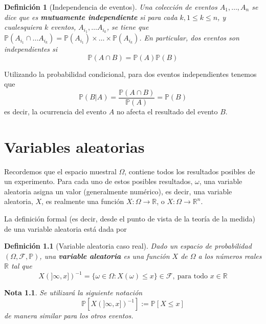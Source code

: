 \documentclass[11pt]{report}
\theoremstyle{break}
\newtheorem{definicion}{Definición}[chapter]
\newtheorem{nota}{Nota}[chapter]
\theoremstyle{break}
\begin{document}
\begin{definicion}[Independencia de eventos]
\label{definicion:independencia de eventos}
Una colección de eventos $A_1, \ldots, A_n$ se dice que es \textbf{mutuamente independiente} si para cada $k, 1 \leq k \leq n$, y cualesquiera $k$ eventos, $A_{i_1}, \ldots A_{i_k}$, se tiene que $\mathbb{P}(A_{i_1} \cap \ldots A_{i_k}) = \mathbb{P}(A_{i_1}) \times \ldots \times \mathbb{P}(A_{i_k})$.
En particular, dos eventos son independientes si
$$
\mathbb{P}(A \cap B) = \mathbb{P}(A)\mathbb{P}(B)
$$ 
\end{definicion}
Utilizando la probabilidad condicional, para dos eventos independientes tenemos que
$$
\mathbb{P}(B|A) = \dfrac{\mathbb{P}(A \cap B)}{\mathbb{P}(A)} = \mathbb{P}(B)
$$
es decir, la ocurrencia del evento $A$ no afecta el resultado del evento $B$.

\chapter{Variables aleatorias}
\label{capitulo:variables aleatorias}

Recordemos que el espacio muestral $\Omega$, contiene todos los resultados posibles de un experimento. Para cada uno de estos posibles resultados, $\omega$, una variable aleatoria asigna un valor (generalmente numérico), es decir, una variable aleatoria, $X$, es realmente una función $X: \Omega \rightarrow \mathbb{R}$, o $X: \Omega \rightarrow \mathbb{R}^n$.

La definición formal (es decir, desde el punto de vista de la teoría de la medida) de una variable aleatoria está dada por

\begin{definicion}[Variable aleatoria caso real]
\label{definicion: variable aleatoria caso real}
Dado un espacio de probabilidad $(\Omega, \mathcal{F}, \mathbb{P})$, una \textbf{variable aleatoria} es una función $X$ de $\Omega$ a los números reales $\mathbb{R}$ tal que
$$
X(]\infty, x])^{-1} = \{\omega  \in \Omega: X(\omega) \leq x  \} \in \mathcal{F}, \medspace \mbox{para todo } x \in \mathbb{R}
$$
\end{definicion}
\begin{nota}
\label{nota: notacion probabilidades}
Se utilizará la siguiente notación
$$
\mathbb{P}[X(]\infty, x])^{-1}] :=\mathbb{P}[X \leq x]
$$
de manera similar para los otros eventos.
\end{nota}
\end{document}
